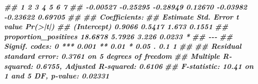 \documentclass[
  11pt,
  oneside]{book}
\newenvironment{Shaded}{\begin{snugshade}}{\end{snugshade}}
\newcommand{\DocumentationTok}[1]{\textcolor[rgb]{0.56,0.35,0.01}{\textbf{\textit{#1}}}}
\begin{document}
\begin{Shaded}
\begin{Highlighting}[]
\DocumentationTok{\#\#        1        2        3        4        5        6        7 }
\DocumentationTok{\#\# {-}0.00527 {-}0.25295 {-}0.28949  0.12670 {-}0.03982 {-}0.23622  0.69705 }
\DocumentationTok{\#\# }
\DocumentationTok{\#\# Coefficients:}
\DocumentationTok{\#\#                      Estimate Std. Error t value Pr(\textgreater{}|t|)  }
\DocumentationTok{\#\# (Intercept)            0.9066     0.5417   1.673   0.1551  }
\DocumentationTok{\#\# proportion\_positives  18.6878     5.7926   3.226   0.0233 *}
\DocumentationTok{\#\# {-}{-}{-}}
\DocumentationTok{\#\# Signif. codes:  0 \textquotesingle{}***\textquotesingle{} 0.001 \textquotesingle{}**\textquotesingle{} 0.01 \textquotesingle{}*\textquotesingle{} 0.05 \textquotesingle{}.\textquotesingle{} 0.1 \textquotesingle{} \textquotesingle{} 1}
\DocumentationTok{\#\# }
\DocumentationTok{\#\# Residual standard error: 0.3761 on 5 degrees of freedom}
\DocumentationTok{\#\# Multiple R{-}squared:  0.6755, Adjusted R{-}squared:  0.6106 }
\DocumentationTok{\#\# F{-}statistic: 10.41 on 1 and 5 DF,  p{-}value: 0.02331}
\end{Highlighting}
\end{Shaded}
\end{document}
